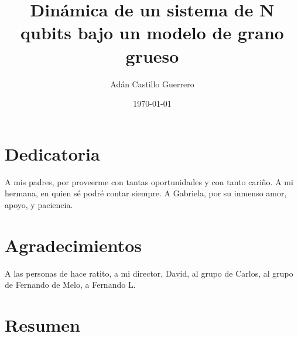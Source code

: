 \documentclass[12pt,twoside]{book}
\title{Dinámica de un sistema de N qubits bajo un modelo de grano grueso}
\author{Adán Castillo Guerrero}
\date{\today}
\begin{document}



\section*{Dedicatoria}
A mis padres, por proveerme con tantas oportunidades y con tanto cariño. A mi hermana, en quien sé podré contar siempre. A Gabriela, por su inmenso amor, apoyo, y paciencia.

\cleardoublepage

\section*{Agradecimientos}
A las personas de hace ratito, a mi director, David, al grupo de Carlos, al grupo de Fernando de Melo, a Fernando L.

\cleardoublepage
\linenumbers
\setlength\linenumbersep{3pt}
\makeatletter
\let\LN@align\align
\let\LN@endalign\endalign
\renewcommand{\align}{\linenomath\LN@align}
\renewcommand{\endalign}{\LN@endalign\endlinenomath}
\let\LN@gather\gather
\let\LN@endgather\endgather
\renewcommand{\gather}{\linenomath\LN@gather}
\renewcommand{\endgather}{\LN@endgather\endlinenomath}
\makeatother

\section*{Resumen}
\end{document}
